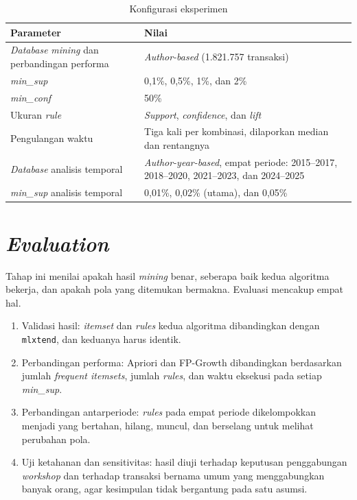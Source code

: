 \begin{table}[!htb]
\caption{Konfigurasi eksperimen}
\label{tab:konfigurasi}
\small
\begin{tabularx}{\textwidth}{@{}p{4.6cm}X@{}}
\toprule
\textbf{Parameter} & \textbf{Nilai} \\
\midrule
\textit{Database} \textit{mining} dan perbandingan performa & \textit{Author-based} (1.821.757 transaksi) \\
\midrule
\textit{min\_sup} & 0,1\%, 0,5\%, 1\%, dan 2\% \\
\midrule
\textit{min\_conf} & 50\% \\
\midrule
Ukuran \textit{rule} & \textit{Support}, \textit{confidence}, dan \textit{lift} \\
\midrule
Pengulangan waktu & Tiga kali per kombinasi, dilaporkan median dan rentangnya \\
\midrule
\textit{Database} analisis temporal & \textit{Author-year-based}, empat periode: 2015--2017, 2018--2020, 2021--2023, dan 2024--2025 \\
\midrule
\textit{min\_sup} analisis temporal & 0,01\%, 0,02\% (utama), dan 0,05\% \\
\bottomrule
\end{tabularx}
\end{table}

\section{\textit{Evaluation}}
Tahap ini menilai apakah hasil \textit{mining} benar, seberapa baik kedua algoritma bekerja, dan apakah pola yang ditemukan bermakna. Evaluasi mencakup empat hal.
\begin{enumerate}
\item Validasi hasil: \textit{itemset} dan \textit{rules} kedua algoritma dibandingkan dengan \texttt{mlxtend}, dan keduanya harus identik.
\item Perbandingan performa: Apriori dan FP-Growth dibandingkan berdasarkan jumlah \textit{frequent itemsets}, jumlah \textit{rules}, dan waktu eksekusi pada setiap \textit{min\_sup}.
\item Perbandingan antarperiode: \textit{rules} pada empat periode dikelompokkan menjadi yang bertahan, hilang, muncul, dan berselang untuk melihat perubahan pola.
\item Uji ketahanan dan sensitivitas: hasil diuji terhadap keputusan penggabungan \textit{workshop} dan terhadap transaksi bernama umum yang menggabungkan banyak orang, agar kesimpulan tidak bergantung pada satu asumsi.
\end{enumerate}

